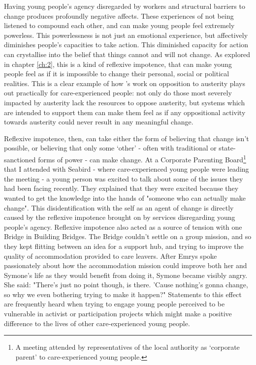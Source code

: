 Having young people's agency disregarded by workers and structural barriers to change produces profoundly negative affects. These experiences of not being listened to compound each other, and can make young people feel extremely powerless. This powerlessness is not just an emotional experience, but affectively diminishes people’s capacities to take action. This diminished capacity for action can crystallise into the belief that things cannot and will not change. As explored in chapter \ref{ch:2}, this is a kind of reflexive impotence, that can make young people feel as if it is impossible to change their personal, social or political realities. This is a clear example of how \citet{harrison_cant_2020}’s work on opposition to austerity plays out practically for care-experienced people: not only do those most severely impacted by austerity lack the resources to oppose austerity, but systems which are intended to support them can make them feel as if any oppositional activity towards austerity could never result in any meaningful change. 

Reflexive impotence, then, can take either the form of believing that change isn’t possible, or believing that only some ‘other’ - often with traditional or state-sanctioned forms of power - can make change. At a Corporate Parenting Board\footnote{A meeting attended by representatives of the local authority as `corporate parent’ to care-experienced young people.} that I attended with Seabird - where care-experienced young people were leading the meeting - a young person was excited to talk about some of the issues they had been facing recently. They explained that they were excited because they wanted to get the knowledge into the hands of "someone who can actually make change".  This disidentification with the self as an agent of change is directly caused by the reflexive impotence brought on by services disregarding young people’s agency. Reflexive impotence also acted as a source of tension with one Bridge in Building Bridges. The Bridge couldn’t settle on a  group mission, and so they kept flitting between an idea for a support hub, and trying to improve the quality of accommodation provided to care leavers. After Emrys spoke passionately about how the accommodation mission could improve both her and Symone's life as they would benefit from doing it, Symone became visibly angry. She said: "There's just no point though, is there. 'Cause nothing's gonna change, so why we even bothering trying to make it happen?" Statements to this effect are frequently heard when trying to engage young people perceived to be vulnerable in activist or participation projects which might make a positive difference to the lives of other care-experienced young people. 

